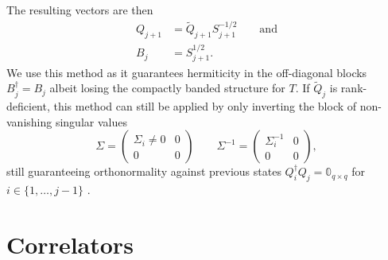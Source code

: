 The resulting vectors are then
\begin{align}
    Q_{j+1} & = \tilde Q_{j+1} S_{j+1}^{-1/2} \qquad \text{and} \\
    B_j     & = S_{j+1}^{1/2}.
\end{align}
We use this method as it guarantees hermiticity in the off-diagonal blocks $B_j^\dag = B_j$
albeit losing the compactly banded structure for $T$.
If $\tilde Q_j$ is rank-deficient,
this method can still be applied \cite{Brass2021} by only inverting the block of
non-vanishing singular values
\begin{equation}
    \Sigma =
    \begin{pmatrix}
        \Sigma_i \neq 0 & 0 \\
        0               & 0
    \end{pmatrix}
    \qquad
    \Sigma^{-1} =
    \begin{pmatrix}
        \Sigma_i^{-1} & 0 \\
        0             & 0
    \end{pmatrix},
\end{equation}
still guaranteeing orthonormality against previous states $Q_i^\dag Q_j = \mathbb{0}_{q\times q}$
for $i \in \{1,\ldots,j-1\}$ \cite{Golub2013}.

\section{Correlators}
\label{sec:correlators}

